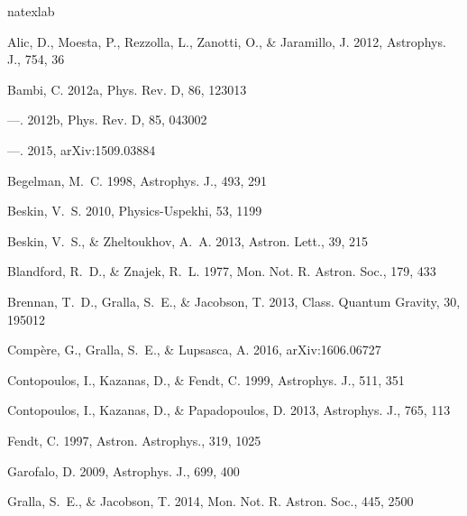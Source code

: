 \documentclass[iop,apj]{emulateapj}
\begin{document}
%
\begin{thebibliography}{}
\expandafter\ifx\csname natexlab\endcsname\relax\def\natexlab#1{#1}\fi

Alic, D., Moesta, P., Rezzolla, L., Zanotti, O., \& Jaramillo, J. 2012,
  Astrophys. J., 754, 36

\bibitem[{Bambi(2012{\natexlab{a}})}]{Bambi2012b}
Bambi, C. 2012{\natexlab{a}}, Phys. Rev. D, 86, 123013

\bibitem[{Bambi(2012{\natexlab{b}})}]{Bambi2012}
---. 2012{\natexlab{b}}, Phys. Rev. D, 85, 043002

---. 2015, arXiv:1509.03884

Begelman, M.~C. 1998, Astrophys. J., 493, 291

Beskin, V.~S. 2010, Physics-Uspekhi, 53, 1199

Beskin, V.~S., \& Zheltoukhov, A.~A. 2013, Astron. Lett., 39, 215

Blandford, R.~D., \& Znajek, R.~L. 1977, Mon. Not. R. Astron. Soc., 179, 433

Brennan, T.~D., Gralla, S.~E., \& Jacobson, T. 2013, Class. Quantum Gravity,
  30, 195012

Comp{\`{e}}re, G., Gralla, S.~E., \& Lupsasca, A. 2016, arXiv:1606.06727

Contopoulos, I., Kazanas, D., \& Fendt, C. 1999, Astrophys. J., 511, 351

Contopoulos, I., Kazanas, D., \& Papadopoulos, D. 2013, Astrophys. J., 765, 113

Fendt, C. 1997, Astron. Astrophys., 319, 1025

Garofalo, D. 2009, Astrophys. J., 699, 400

Gralla, S.~E., \& Jacobson, T. 2014, Mon. Not. R. Astron. Soc., 445, 2500


\end{thebibliography}
\end{document}
